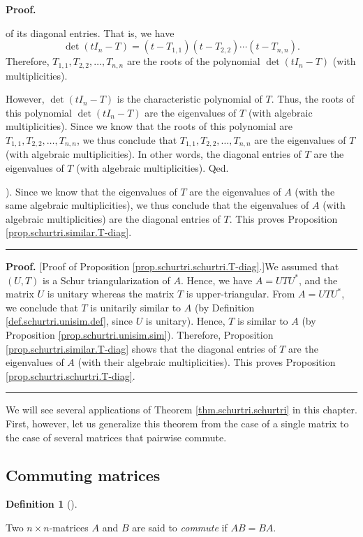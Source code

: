 \documentclass[numbers=enddot,12pt,final,onecolumn,notitlepage]{scrartcl}%
\numberwithin{exer}{subsection}
\theoremstyle{definition}
\newtheorem{defi}[theo]{Definition}
\newenvironment{definition}[1][]
{\begin{defi}[#1]\begin{leftbar}}
{\end{leftbar}\end{defi}}
\newenvironment{proof}[1][Proof]{\noindent\textbf{#1.} }{\ \rule{0.5em}{0.5em}}
\begin{document}
\begin{proof}
{of its diagonal entries. That is, we have%
\[
\det\left(  tI_{n}-T\right)  =\left(  t-T_{1,1}\right)  \left(  t-T_{2,2}%
\right)  \cdots\left(  t-T_{n,n}\right)  .
\]
Therefore, $T_{1,1},T_{2,2},\ldots,T_{n,n}$ are the roots of the polynomial
$\det\left(  tI_{n}-T\right)  $ (with multiplicities).
\par
However, $\det\left(  tI_{n}-T\right)  $ is the characteristic polynomial of
$T$. Thus, the roots of this polynomial $\det\left(  tI_{n}-T\right)  $ are
the eigenvalues of $T$ (with algebraic multiplicities). Since we know that the
roots of this polynomial are $T_{1,1},T_{2,2},\ldots,T_{n,n}$, we thus
conclude that $T_{1,1},T_{2,2},\ldots,T_{n,n}$ are the eigenvalues of $T$
(with algebraic multiplicities). In other words, the diagonal entries of $T$
are the eigenvalues of $T$ (with algebraic multiplicities). Qed.}). Since we
know that the eigenvalues of $T$ are the eigenvalues of $A$ (with the same
algebraic multiplicities), we thus conclude that the eigenvalues of $A$ (with
algebraic multiplicities) are the diagonal entries of $T$. This proves
Proposition \ref{prop.schurtri.similar.T-diag}.
\end{proof}

\begin{proof}
[Proof of Proposition \ref{prop.schurtri.schurtri.T-diag}.]We assumed that
$\left(  U,T\right)  $ is a Schur triangularization of $A$. Hence, we have
$A=UTU^{\ast}$, and the matrix $U$ is unitary whereas the matrix $T$ is
upper-triangular. From $A=UTU^{\ast}$, we conclude that $T$ is unitarily
similar to $A$ (by Definition \ref{def.schurtri.unisim.def}, since $U$ is
unitary). Hence, $T$ is similar to $A$ (by Proposition
\ref{prop.schurtri.unisim.sim}). Therefore, Proposition
\ref{prop.schurtri.similar.T-diag} shows that the diagonal entries of $T$ are
the eigenvalues of $A$ (with their algebraic multiplicities). This proves
Proposition \ref{prop.schurtri.schurtri.T-diag}.
\end{proof}

We will see several applications of Theorem \ref{thm.schurtri.schurtri} in
this chapter. First, however, let us generalize this theorem from the case of
a single matrix to the case of several matrices that pairwise commute.

\subsection{Commuting matrices}

\begin{definition}
Two $n\times n$-matrices $A$ and $B$ are said to \emph{commute} if $AB=BA$.
\end{definition}
\end{document}
